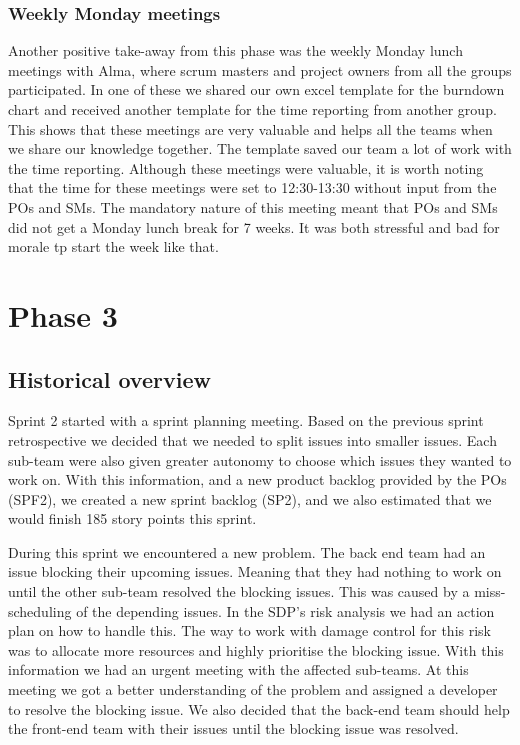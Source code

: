 \documentclass{article}
\begin{document}
\subsubsection{Weekly Monday meetings}
Another positive take-away from this phase was the weekly Monday lunch meetings with Alma, where scrum masters and project owners from all the groups participated. In one of these we shared our own excel template for the burndown chart and received another template for the time reporting from another group. This shows that these meetings are very valuable and helps all the teams when we share our knowledge together. The template saved our team a lot of work with the time reporting. Although these meetings were valuable, it is worth noting that the time for these meetings were set to 12:30-13:30 without input from the POs and SMs. The mandatory nature of this meeting meant that POs and SMs did not get a Monday lunch break for 7 weeks. 
It was both stressful and bad for morale tp start the week like that.


\section{Phase 3} %
\subsection{Historical overview}
Sprint 2 started with a sprint planning meeting. Based on the previous sprint retrospective we decided that we needed to split issues into smaller issues. Each sub-team were also given greater autonomy to choose which issues they wanted to work on. With this information, and a new product backlog provided by the POs (SPF2), we created a new sprint backlog (SP2), and we also estimated that we would finish 185 story points this sprint. 

During this sprint we encountered a new problem. The back end team had an issue blocking their upcoming issues. Meaning that they had nothing to work on until the other sub-team resolved the blocking issues. This was caused by a miss-scheduling of the depending issues. In the SDP's risk analysis we had an action plan on how to handle this. The way to work with damage control for this risk was to allocate more resources and highly prioritise the blocking issue. With this information we had an urgent meeting with the affected sub-teams. At this meeting we got a better understanding of the problem and assigned a developer to resolve the blocking issue. We also decided that the back-end team should help the front-end team with their issues until the blocking issue was resolved. 
\end{document}
